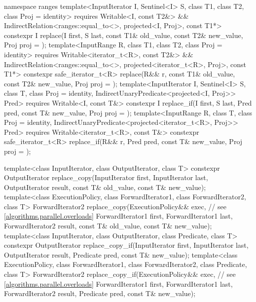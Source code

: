 \begin{codeblock}
{  namespace ranges {
    template<InputIterator I, Sentinel<I> S, class T1, class T2, class Proj = identity>
      requires Writable<I, const T2&> &&
        IndirectRelation<ranges::equal_to<>, projected<I, Proj>, const T1*>
      constexpr I
        replace(I first, S last, const T1& old_value, const T2& new_value, Proj proj = {});
    template<InputRange R, class T1, class T2, class Proj = identity>
      requires Writable<iterator_t<R>, const T2&> &&
        IndirectRelation<ranges::equal_to<>, projected<iterator_t<R>, Proj>, const T1*>
      constexpr safe_iterator_t<R>
        replace(R&& r, const T1& old_value, const T2& new_value, Proj proj = {});
    template<InputIterator I, Sentinel<I> S, class T, class Proj = identity,
        IndirectUnaryPredicate<projected<I, Proj>> Pred>
      requires Writable<I, const T&>
      constexpr I replace_if(I first, S last, Pred pred, const T& new_value, Proj proj = {});
    template<InputRange R, class T, class Proj = identity,
        IndirectUnaryPredicate<projected<iterator_t<R>, Proj>> Pred>
      requires Writable<iterator_t<R>, const T&>
      constexpr safe_iterator_t<R>
        replace_if(R&& r, Pred pred, const T& new_value, Proj proj = {});
  }

  template<class InputIterator, class OutputIterator, class T>
    constexpr OutputIterator replace_copy(InputIterator first, InputIterator last,
                                          OutputIterator result,
                                          const T& old_value, const T& new_value);
  template<class ExecutionPolicy, class ForwardIterator1, class ForwardIterator2, class T>
    ForwardIterator2 replace_copy(ExecutionPolicy&& exec, // see \ref{algorithms.parallel.overloads}
                                  ForwardIterator1 first, ForwardIterator1 last,
                                  ForwardIterator2 result,
                                  const T& old_value, const T& new_value);
  template<class InputIterator, class OutputIterator, class Predicate, class T>
    constexpr OutputIterator replace_copy_if(InputIterator first, InputIterator last,
                                             OutputIterator result,
                                             Predicate pred, const T& new_value);
  template<class ExecutionPolicy, class ForwardIterator1, class ForwardIterator2,
           class Predicate, class T>
    ForwardIterator2 replace_copy_if(ExecutionPolicy&& exec, // see \ref{algorithms.parallel.overloads}
                                     ForwardIterator1 first, ForwardIterator1 last,
                                     ForwardIterator2 result,
                                     Predicate pred, const T& new_value);

}
\end{codeblock}

